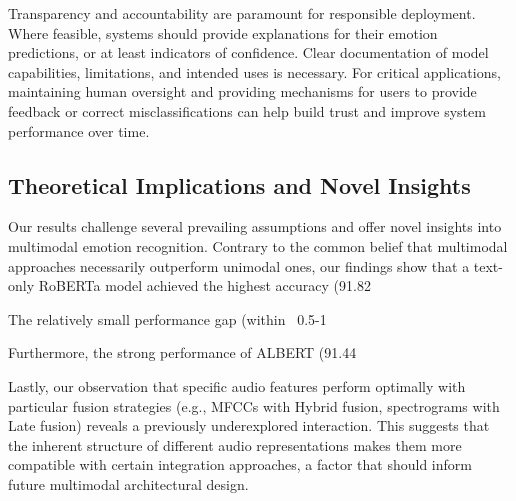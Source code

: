 \documentclass[12pt]{article}
\begin{document}
Transparency and accountability are paramount for responsible deployment. Where feasible, systems should provide explanations for their emotion predictions, or at least indicators of confidence. Clear documentation of model capabilities, limitations, and intended uses is necessary. For critical applications, maintaining human oversight and providing mechanisms for users to provide feedback or correct misclassifications can help build trust and improve system performance over time.

\subsection{Theoretical Implications and Novel Insights}
Our results challenge several prevailing assumptions and offer novel insights into multimodal emotion recognition. Contrary to the common belief that multimodal approaches necessarily outperform unimodal ones, our findings show that a text-only RoBERTa model achieved the highest accuracy (91.82%

The relatively small performance gap (within ~0.5-1%
    
Furthermore, the strong performance of ALBERT (91.44%
    
Lastly, our observation that specific audio features perform optimally with particular fusion strategies (e.g., MFCCs with Hybrid fusion, spectrograms with Late fusion) reveals a previously underexplored interaction. This suggests that the inherent structure of different audio representations makes them more compatible with certain integration approaches, a factor that should inform future multimodal architectural design.
    
\end{document}
